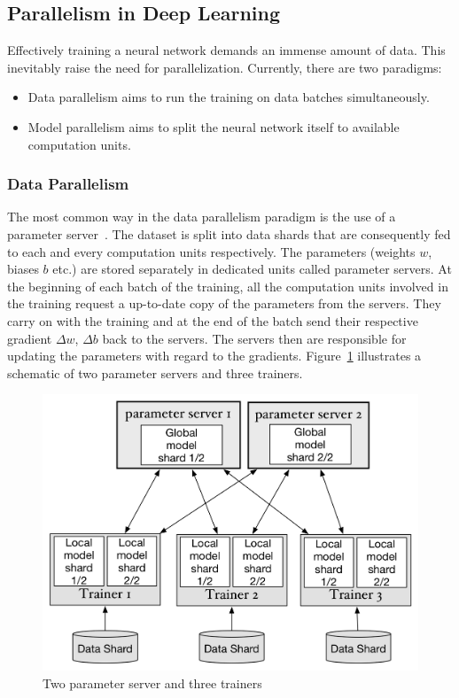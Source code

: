 \subsection{Parallelism in Deep Learning}
Effectively training a neural network demands an immense amount of data. This 
inevitably raise the need for parallelization. Currently, there are two 
paradigms:
\begin{itemize}
    \item Data parallelism aims to run the training on data batches 
        simultaneously.
    \item Model parallelism aims to split the neural network itself to available 
        computation units.
\end{itemize}

\subsubsection{Data Parallelism}
The most common way in the data parallelism paradigm is the use of a parameter 
server~\cite{pserver}. The dataset is split into data shards that are 
consequently fed to each and every computation units respectively. The 
parameters (weights $w$, biases $b$ etc.) are stored separately in dedicated units 
called parameter servers. At the beginning of each batch of the training, all 
the computation units involved in the training request a up-to-date copy of the 
parameters from the servers. They carry on with the training and at the end of 
the batch send their respective gradient $\Delta w$, $\Delta b$ back to the 
servers. The servers then are responsible for updating the parameters with 
regard to the gradients. Figure~\ref{fig:pserver} illustrates a schematic of two 
parameter servers and three trainers.
\begin{figure}[H]
    \centerline{\includegraphics[scale=0.40]{background/figs/data_parallelism.png}}
    \caption{Two parameter server and three trainers}
    \label{fig:pserver}
\end{figure}

